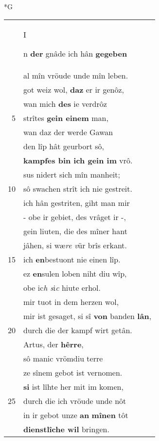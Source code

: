 \documentclass[8pt,a4paper,notitlepage]{article}
\begin{document}
\begin{table}[ht]
\begin{minipage}[t]{0.5\linewidth}
\small
\begin{center}*G
\end{center}
\begin{tabular}{rl}
 & \begin{large}I\end{large}n \textbf{der} gnâde ich hân \textbf{gegeben}\\ 
 & al mîn vröude unde mîn leben.\\ 
 & got weiz wol, \textbf{daz} er ir genôz,\\ 
 & wan mich \textbf{des} ie verdrôz\\ 
5 & strîtes \textbf{gein einem} man,\\ 
 & wan daz der werde Gawan\\ 
 & den lîp hât geurbort sô,\\ 
 & \textbf{kampfes bin ich gein im} vrô.\\ 
 & sus nidert sich mîn manheit;\\ 
10 & sô swachen strît ich nie gestreit.\\ 
 & ich hân gestriten, giht man mir\\ 
 & - obe ir gebiet, des vrâget ir -,\\ 
 & gein liuten, die des mîner hant\\ 
 & jâhen, si wæ\textit{re} \textit{v}ür brîs erkant.\\ 
15 & ich \textbf{en}bestuont nie einen lîp.\\ 
 & ez \textbf{en}sulen loben niht diu wîp,\\ 
 & obe ic\textit{h s}i\textit{c} hiute erhol.\\ 
 & mir tuot in dem herzen wol,\\ 
 & mir ist gesaget, si sî \textbf{von} banden \textbf{lân},\\ 
20 & durch die der kampf wirt getân.\\ 
 & Artus, der \textbf{hêrre},\\ 
 & sô manic vrömdiu terre\\ 
 & ze sînem gebot ist vernomen.\\ 
 & \textbf{si} ist lîhte her mit im komen,\\ 
25 & durch die ich vröude unde nôt\\ 
 & in ir gebot unze \textbf{an} \textbf{mînen} tôt\\ 
 & \textbf{dienstlîche wil} bringen.\\ 

\end{tabular}
\end{minipage}
\end{table}
\end{document}
